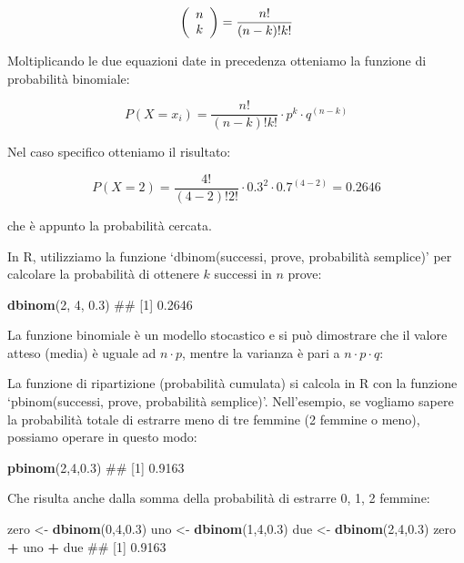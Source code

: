 \documentclass[a4paper,12pt,oneside]{book}
\newenvironment{Shaded}{\begin{snugshade}}{\end{snugshade}}
\newcommand{\KeywordTok}[1]{\textcolor[rgb]{0.13,0.29,0.53}{\textbf{#1}}}
\newcommand{\DecValTok}[1]{\textcolor[rgb]{0.00,0.00,0.81}{#1}}
\newcommand{\FloatTok}[1]{\textcolor[rgb]{0.00,0.00,0.81}{#1}}
\newcommand{\StringTok}[1]{\textcolor[rgb]{0.31,0.60,0.02}{#1}}
\newcommand{\OperatorTok}[1]{\textcolor[rgb]{0.81,0.36,0.00}{\textbf{#1}}}
\newcommand{\NormalTok}[1]{#1}
\theoremstyle{definition}
\theoremstyle{definition}
\theoremstyle{definition}
\theoremstyle{remark}
\begin{document}
\[\left( {\begin{array}{*{20}c}
n  \\
k  \\
\end{array}} \right) = \frac{n!}{(n - k)!k!} \]

Moltiplicando le due equazioni date in precedenza otteniamo la funzione
di probabilità binomiale:

\[P(X = x_i ) = \frac{{n!}}{{(n - k)!k!}} \cdot p^k \cdot q^{(n - k)} \]

Nel caso specifico otteniamo il risultato:

\[P(X = 2) = \frac{4!}{(4 - 2)!2!} \cdot 0.3^2 \cdot 0.7^{(4 - 2)}  = 0.2646 \]

che è appunto la probabilità cercata.

In R, utilizziamo la funzione `dbinom(successi, prove, probabilità
semplice)' per calcolare la probabilità di ottenere \(k\) successi in
\(n\) prove:

\begin{Shaded}
\begin{Highlighting}[]
\KeywordTok{dbinom}\NormalTok{(}\DecValTok{2}\NormalTok{, }\DecValTok{4}\NormalTok{, }\FloatTok{0.3}\NormalTok{)}
\NormalTok{## [1] 0.2646}
\end{Highlighting}
\end{Shaded}

La funzione binomiale è un modello stocastico e si può dimostrare che il
valore atteso (media) è uguale ad \(n\cdot p\), mentre la varianza è
pari a \(n\cdot p \cdot q\):

La funzione di ripartizione (probabilità cumulata) si calcola in R con
la funzione `pbinom(successi, prove, probabilità semplice)'.
Nell'esempio, se vogliamo sapere la probabilità totale di estrarre meno
di tre femmine (2 femmine o meno), possiamo operare in questo modo:

\begin{Shaded}
\begin{Highlighting}[]
\KeywordTok{pbinom}\NormalTok{(}\DecValTok{2}\NormalTok{,}\DecValTok{4}\NormalTok{,}\FloatTok{0.3}\NormalTok{)}
\NormalTok{## [1] 0.9163}
\end{Highlighting}
\end{Shaded}

Che risulta anche dalla somma della probabilità di estrarre 0, 1, 2
femmine:

\begin{Shaded}
\begin{Highlighting}[]
\NormalTok{zero <-}\StringTok{ }\KeywordTok{dbinom}\NormalTok{(}\DecValTok{0}\NormalTok{,}\DecValTok{4}\NormalTok{,}\FloatTok{0.3}\NormalTok{)}
\NormalTok{uno <-}\StringTok{ }\KeywordTok{dbinom}\NormalTok{(}\DecValTok{1}\NormalTok{,}\DecValTok{4}\NormalTok{,}\FloatTok{0.3}\NormalTok{)}
\NormalTok{due <-}\StringTok{ }\KeywordTok{dbinom}\NormalTok{(}\DecValTok{2}\NormalTok{,}\DecValTok{4}\NormalTok{,}\FloatTok{0.3}\NormalTok{)}
\NormalTok{zero }\OperatorTok{+}\StringTok{ }\NormalTok{uno }\OperatorTok{+}\StringTok{ }\NormalTok{due}
\NormalTok{## [1] 0.9163}
\end{Highlighting}
\end{Shaded}
\end{document}
